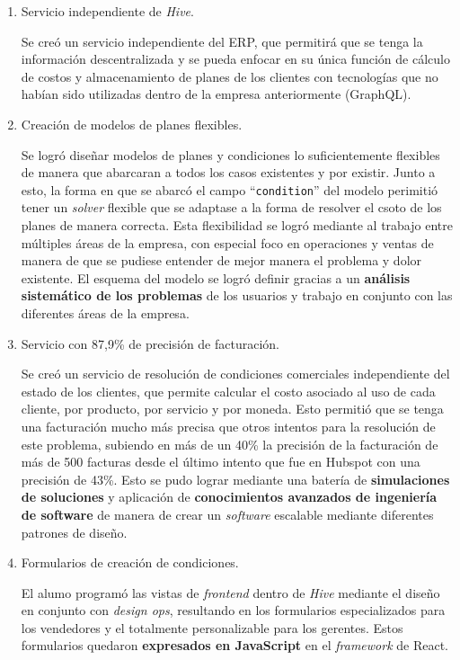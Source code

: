   \begin{enumerate}
    \item Servicio independiente de \textit{Hive}.
    
    Se creó un servicio independiente del ERP, que permitirá que se tenga la información descentralizada y se pueda enfocar en su única función de cálculo de costos y almacenamiento de planes de los clientes con tecnologías que no habían sido utilizadas dentro de la empresa anteriormente (GraphQL).

    \item Creación de modelos de planes flexibles.

    Se logró diseñar modelos de planes y condiciones lo suficientemente flexibles de manera que abarcaran a todos los casos existentes y por existir. Junto a esto, la forma en que se abarcó el campo ``\texttt{condition}'' del modelo perimitió tener un \textit{solver} flexible que se adaptase a la forma de resolver el csoto de los planes de manera correcta. Esta flexibilidad se logró mediante al trabajo entre múltiples áreas de la empresa, con especial foco en operaciones y ventas de manera de que se pudiese entender de mejor manera el problema y dolor existente. El esquema del modelo se logró definir gracias a un \textbf{análisis sistemático de los problemas} de los usuarios y trabajo en conjunto con las diferentes áreas de la empresa.

    \item Servicio con 87,9\% de precisión de facturación.
    
    Se creó un servicio de resolución de condiciones comerciales independiente del estado de los clientes, que permite calcular el costo asociado al uso de cada cliente, por producto, por servicio y por moneda. Esto permitió que se tenga una facturación mucho más precisa que otros intentos para la resolución de este problema, subiendo en más de un 40\% la precisión de la facturación de más de 500 facturas desde el último intento que fue en Hubspot con una precisión de 43\%. Esto se pudo lograr mediante una batería de \textbf{simulaciones de soluciones} y aplicación de \textbf{conocimientos avanzados de ingeniería de software} de manera de crear un \textit{software} escalable mediante diferentes patrones de diseño.

    \item Formularios de creación de condiciones.

    El alumo programó las vistas de \textit{frontend} dentro de \textit{Hive} mediante el diseño en conjunto con \textit{design ops}, resultando en los formularios especializados para los vendedores y el totalmente personalizable para los gerentes. Estos formularios quedaron \textbf{expresados en JavaScript} en el \textit{framework} de React.
    

\end{enumerate}
